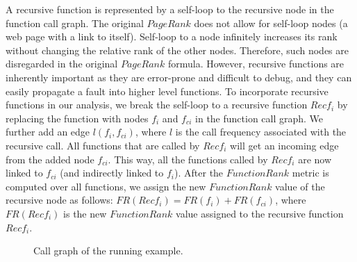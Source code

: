 A recursive function is represented by a self-loop to the recursive node in the function call graph.
The original $PageRank$ does not allow for self-loop nodes (\ie a web page with a link to itself).
Self-loop to a node infinitely increases its rank without changing the relative rank of the other
nodes. Therefore, such nodes are disregarded in the original $PageRank$ formula. 
However, recursive functions are inherently important as they are error-prone and difficult to debug, and they can easily propagate a fault into higher level functions. To incorporate recursive functions in our analysis, we break the self-loop to a recursive function $Recf_i$ by replacing the function with nodes $f_i$ and $f_{ci}$ in the function call graph. We further add an edge $l(f_i,f_{ci})$, where $l$ is the call frequency associated with the recursive call. 
All functions that are called by $Recf_i$ will get an incoming edge from the added node $f_{ci}$.  
This way,  all the functions called by $Recf_i$ are now linked to $f_{ci}$ (and indirectly linked to $f_i$).
After the $FunctionRank$ metric is computed over all functions, we assign the new $FunctionRank$ value of the recursive node as follows: 
$FR(Recf_i)=FR(f_i)+FR(f_{ci})$, where $FR(Recf_i)$ is the new $FunctionRank$ value assigned to the recursive function $Recf_i$. %

\begin{figure} %
\centering
\hspace*{-0.4in} 
\hspace*{-0.4in}       
\vspace{0.2in}             
\caption{Call graph of the running example.}
\label{Fig:exampleGraph}
\end{figure}
 
